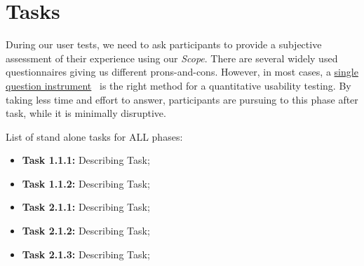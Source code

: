 
\section{Tasks}
\label{sec:sec007}

During our user tests, we need to ask participants to provide a subjective assessment of their experience using our \textit{Scope}. There are several widely used questionnaires giving us different prons-and-cons. However, in most cases, a \hyperlink{https://www.nngroup.com/articles/keep-online-surveys-short/}{single question instrument}~\cite{sauro201210} is the right method for a quantitative usability testing. By taking less time and effort to answer, participants are pursuing to this phase after task, while it is minimally disruptive.


\hfill

List of stand alone tasks for ALL phases:


\hfill

\begin{itemize}
\item[] \textbf{Task 1.1.1:} Describing Task;
\item[] \textbf{Task 1.1.2:} Describing Task;
\end{itemize}

\begin{itemize}
\item[] \textbf{Task 2.1.1:} Describing Task;
\item[] \textbf{Task 2.1.2:} Describing Task;
\item[] \textbf{Task 2.1.3:} Describing Task;
\end{itemize}

\hfill

